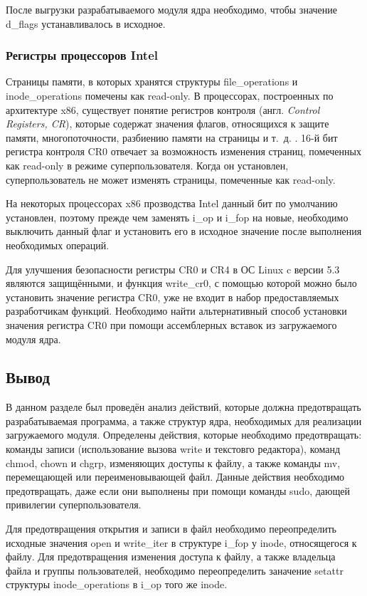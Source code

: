 После выгрузки разрабатываемого модуля ядра необходимо, чтобы значение d\_flags устанавливалось в исходное.


\subsubsection{Регистры процессоров Intel}

Страницы памяти, в которых хранятся структуры file\_operations и \linebreak inode\_operations помечены как read-only. В процессорах, построенных по архитектуре x86, существует понятие регистров контроля (англ. \textit{Control Registers, CR}), которые содержат значения флагов, относящихся к защите памяти, многопоточности, разбиению памяти на страницы и т.~д. \cite{intel-manual}. 16-й бит регистра контроля CR0 отвечает за возможность изменения страниц, помеченных как read-only в режиме суперпользователя. Когда он установлен, суперпользователь не может изменять страницы, помеченные как read-only.

На некоторых процессорах x86 прозводства Intel данный бит по умолчанию установлен, поэтому прежде чем заменять i\_op и i\_fop на новые, необходимо выключить данный флаг и установить его в исходное значение после выполнения необходимых операций.

Для улучшения безопасности регистры CR0 и CR4 в ОС Linux c версии 5.3 являются защищёнными, и функция write\_cr0, с помощью которой можно было установить значение регистра CR0, уже не входит в набор предоставляемых разработчикам функций. Необходимо найти альтернативный способ установки значения регистра CR0 при помощи ассемблерных вставок из загружаемого модуля ядра.

\subsection*{Вывод}
В данном разделе был проведён анализ действий, которые должна предотвращать разрабатываемая программа, а также структур ядра, необходимых для реализации загружаемого модуля.
Определены действия, которые необходимо предотвращать: команды записи (использование вызова write и текстовго редактора), команд chmod, chown и chgrp, изменяющих доступы к файлу, а также команды mv, перемещающей или переименовывающей файл. Данные действия необходимо предотвращать, даже если они выполнены при помощи команды sudo, дающей привилегии суперпользователя.

Для предотвращения открытия и записи в файл необходимо переопределить исходные значения open и write\_iter в структуре i\_fop у inode, относящегося к файлу.
Для предотвращения изменения доступа к файлу, а также владельца файла и группы пользователей, необходимо переопределить заначение setattr структуры inode\_operations в i\_op того же inode.

